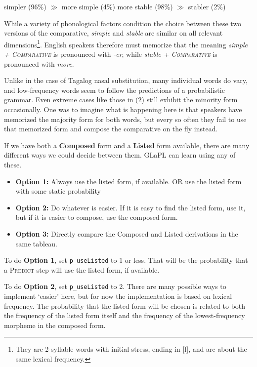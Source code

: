 \documentclass[12]{article}
\begin{document}
		\begin{exe}
			\ex \begin{xlist}
				\ex simpler (96\%) $\gg$ more simple (4\%)
				\ex more stable (98\%) $\gg$ stabler (2\%)
			\end{xlist}
		\end{exe}
		
		While a variety of phonological factors condition the choice between these two versions of the comparative, {\it simple} and {\it stable} are similar on all relevant dimensions\footnote{They are 2-syllable words with initial stress, ending in [l], and are about the same lexical frequency.}.  English speakers therefore must memorize that the meaning {\it simple + \textsc{Comparative}} is pronounced with {\it -er}, while {\it stable + \textsc{Comparative}} is pronounced with {\it more}.
		
		Unlike in the case of Tagalog nasal substitution, many individual words do vary, and low-frequency words seem to follow the predictions of a probabilistic grammar.  Even extreme cases like those in (2) still exhibit the minority form occasionally.  One was to imagine what is happening here is that speakers have memorized the majority form for both words, but every so often they fail to use that memorized form and compose the comparative on the fly instead.
		
		\hspace{2ex}
		
		
		If we have both a {\bf Composed} form and a {\bf Listed} form available, there are many different ways we could decide between them.  GLaPL can learn using any of these.
		
		\begin{itemize}
			\item[] {\bf Option 1:} Always use the listed form, if available.  OR use the listed form with some static probability
			\item[] {\bf Option 2:} Do whatever is easier.  If it is easy to find the listed form, use it, but if it is easier to compose, use the composed form.
			\item[] {\bf Option 3:} Directly compare the Composed and Listed derivations in the same tableau.
		\end{itemize}

		To do {\bf Option 1}, set \texttt{p\_useListed} to 1 or less.  That will be the probability that a \textsc{Predict} step will use the listed form, if available.
		
		To do {\bf Option 2}, set \texttt{p\_useListed} to 2. There are many possible ways to implement `easier' here, but for now the implementation is based on lexical frequency.  The probability that the listed form will be chosen is related to both the frequency of the listed form itself and the frequency of the lowest-frequency morpheme in the composed form.  
		
\end{document}
